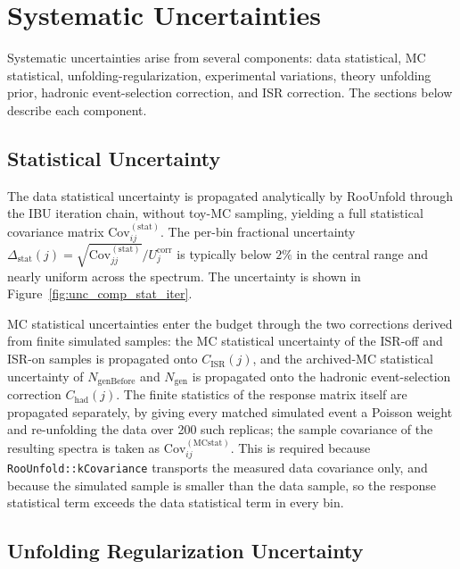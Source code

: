\section{Systematic Uncertainties}
\label{sec:systematics}

Systematic uncertainties arise from several components: data statistical, MC statistical, unfolding-regularization, experimental variations, theory unfolding prior, hadronic event-selection correction, and ISR correction. The sections below describe each component.

\subsection{Statistical Uncertainty}
\label{sec:stat_uncertainty}

The data statistical uncertainty is propagated analytically by RooUnfold through the IBU iteration chain, without toy-MC sampling, yielding a full statistical covariance matrix $\mathrm{Cov}^{(\mathrm{stat})}_{ij}$. The per-bin fractional uncertainty $\Delta_{\mathrm{stat}}(j)=\sqrt{\mathrm{Cov}^{(\mathrm{stat})}_{jj}}/U_j^{\mathrm{corr}}$ is typically below $2\%$ in the central range and nearly uniform across the spectrum. The uncertainty is shown in Figure~\ref{fig:unc_comp_stat_iter}.

MC statistical uncertainties enter the budget through the two corrections derived from finite simulated samples: the MC statistical uncertainty of the ISR-off and ISR-on samples is propagated onto $C_{\mathrm{ISR}}(j)$, and the archived-MC statistical uncertainty of $N_{\mathrm{genBefore}}$ and $N_{\mathrm{gen}}$ is propagated onto the hadronic event-selection correction $C_{\mathrm{had}}(j)$. The finite statistics of the response matrix itself are propagated separately, by giving every matched simulated event a Poisson weight and re-unfolding the data over 200 such replicas; the sample covariance of the resulting spectra is taken as $\mathrm{Cov}^{(\mathrm{MCstat})}_{ij}$. This is required because \texttt{RooUnfold::kCovariance} transports the measured data covariance only, and because the simulated sample is smaller than the data sample, so the response statistical term exceeds the data statistical term in every bin.

\subsection{Unfolding Regularization Uncertainty}
\label{sec:regularization_uncertainty}

